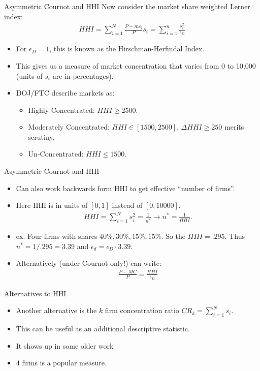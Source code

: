 \documentclass[xcolor=pdftex,dvipsnames,table,mathserif]{beamer}
\begin{document}
\begin{frame}{Asymmetric Cournot and HHI}
Now consider the market share weighted Lerner index:
\begin{eqnarray*}
HHI = \sum_{i=1}^N \frac{P - mc_i}{P} s_i = \sum_{i=1}^n \frac{s_i^2}{\epsilon_D}
\end{eqnarray*}
\begin{itemize}
\item For $\epsilon_D =1$, this is known as the \alert{Hirschman-Herfindal Index}.
\item This gives us a measure of \alert{market concentration} that varies from 0 to 10,000 (units of $s_i$ are in percentages).
\item DOJ/FTC describe markets as:
\begin{itemize}
\item Highly Concentrated: $HHI \geq 2500$.
\item Moderately Concentrated: $HHI \in [1500,2500]$. $\Delta HHI \geq 250$ merits scrutiny.
\item Un-Concentrated: $HHI \leq 1500$.
\end{itemize}
\end{itemize}
\end{frame}

\begin{frame}{Asymmetric Cournot and HHI}
\begin{itemize}
\item Can also work backwards form HHI to get effective ``number of firms''.
\item Here HHI is in units of $[0,1]$ instead of $[0,10000]$.
\begin{eqnarray*}
HHI = \sum_{i=1}^N s_i^2 = \frac{1}{n^*} \rightarrow n^{*} = \frac{1}{HHI}.
\end{eqnarray*}
\item ex. Four firms with shares $40\%, 30\%, 15\%, 15\%$. So the $HHI =.295$. Thus $n^{*} = 1/.295 = 3.39$ and $\epsilon_d = \epsilon_D \cdot 3.39$.
\item Alternatively (under Cournot only!) can write:
\begin{eqnarray*}
\frac{P-MC}{P} = \frac{HHI}{\epsilon_D}
\end{eqnarray*}

\end{itemize}
\end{frame}

\begin{frame}{Alternatives to HHI}
\begin{itemize}
\item Another alternative is the $k$ firm concentration ratio $CR_k = \sum_{i=1}^N s_i$.
\item This can be useful as an additional descriptive statistic.
\item It shows up in some older work
\item $4$ firms is a popular measure.
\end{itemize}
\end{frame}
\end{document}
